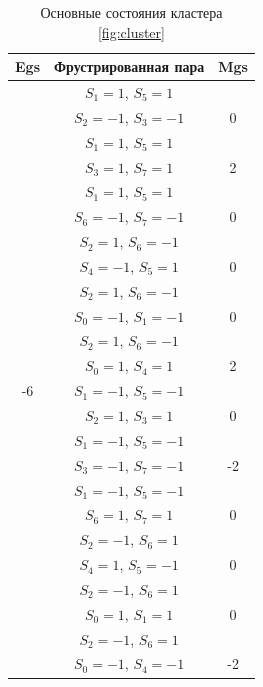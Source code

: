 \documentclass[utf8, babel, sor, jor, amsmath, amssymb, reprint]{elsarticle} %
\begin{document}
\begin{table}[h]
	\centering
	\begin{tabular}{|c|c|c|}
		\hline
		Egs   &   Фрустрированная пара & Mgs\\
		\hline
		  &  $S_1=1$, $S_5=1$ & \\
		      &    $S_2=-1$, $S_3=-1$ &0 \\
		 \cline{2-3}
		   &  $S_1=1$, $S_5=1$ &\\
		      &    $S_3=1$, $S_7=1$ & 2\\
		 \cline{2-3}
		   &  $S_1=1$, $S_5=1$ & \\
		      &    $S_6=-1$, $S_7=-1$ & 0\\
		 \cline{2-3}
		  &  $S_2=1$, $S_6=-1$ & \\
				&    $S_4=-1$, $S_5=1$ & 0\\
		 \cline{2-3}
		  &  $S_2=1$, $S_6=-1$ &\\
				&    $S_0=-1$, $S_1=-1$ & 0\\
		 \cline{2-3}
		   &  $S_2=1$, $S_6=-1$ &\\
				&    $S_0=1$, $S_4=1$ & 2\\
				\cline{2-3}
				-6	\multirow{3}{*}{}
		   &  $S_1=-1$, $S_5=-1$ &\\
			&    $S_2=1$, $S_3=1$ & 0\\
		\cline{2-3}
		   &  $S_1=-1$, $S_5=-1$ &\\
			&    $S_3=-1$, $S_7=-1$ & -2\\
		\cline{2-3}
		   &  $S_1=-1$, $S_5=-1$ &\\
			&    $S_6=1$, $S_7=1$ & 0\\
	\cline{2-3}
		   &  $S_2=-1$, $S_6=1$ &\\
			&    $S_4=1$, $S_5=-1$ & 0\\
	\cline{2-3}
		   &  $S_2=-1$, $S_6=1$ &\\
			&    $S_0=1$, $S_1=1$ & 0\\
		\cline{2-3}
		   &  $S_2=-1$, $S_6=1$ &\\
			&    $S_0=-1$, $S_4=-1$ & -2\\
		\hline
	\end{tabular}
	\caption{Основные состояния кластера \eqref{fig:cluster}}
	\label{tab:gs_cl}
\end{table}
\end{document}
